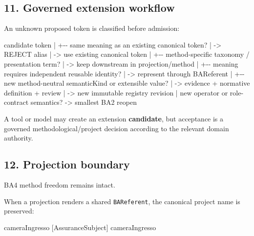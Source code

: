 \documentclass[
  10pt,
  a4paper,
]{article}
\newenvironment{Shaded}{}{}
\newcommand{\NormalTok}[1]{#1}
\begin{document}
\subsection{11. Governed extension
workflow}\label{11-governed-extension-workflow}

An unknown proposed token is classified before admission:

\begin{Shaded}
\begin{Highlighting}[]
\NormalTok{candidate token}
\NormalTok{    |}
\NormalTok{    +{-}{-} same meaning as an existing canonical token?}
\NormalTok{    |      {-}\textgreater{} REJECT alias}
\NormalTok{    |      {-}\textgreater{} use existing canonical token}
\NormalTok{    |}
\NormalTok{    +{-}{-} method{-}specific taxonomy / presentation term?}
\NormalTok{    |      {-}\textgreater{} keep downstream in projection/method}
\NormalTok{    |}
\NormalTok{    +{-}{-} meaning requires independent reusable identity?}
\NormalTok{    |      {-}\textgreater{} represent through BAReferent}
\NormalTok{    |}
\NormalTok{    +{-}{-} new method{-}neutral semanticKind or extensible value?}
\NormalTok{    |      {-}\textgreater{} evidence + normative definition + review}
\NormalTok{    |      {-}\textgreater{} new immutable registry revision}
\NormalTok{    |}
\NormalTok{    \textasciigrave{}{-}{-} new operator or role{-}contract semantics?}
\NormalTok{           {-}\textgreater{} smallest BA2 reopen}
\end{Highlighting}
\end{Shaded}

A tool or model may create an extension \textbf{candidate}, but
acceptance is a governed methodological/project decision according to
the relevant domain authority.

\subsection{12. Projection boundary}\label{12-projection-boundary}

BA4 method freedom remains intact.

When a projection renders a shared \texttt{BAReferent}, the canonical
project name is preserved:

\begin{Shaded}
\begin{Highlighting}[]
\NormalTok{[FlowParticipant]  cameraIngresso}
\NormalTok{[AssuranceSubject] cameraIngresso}
\end{Highlighting}
\end{Shaded}
\end{document}
